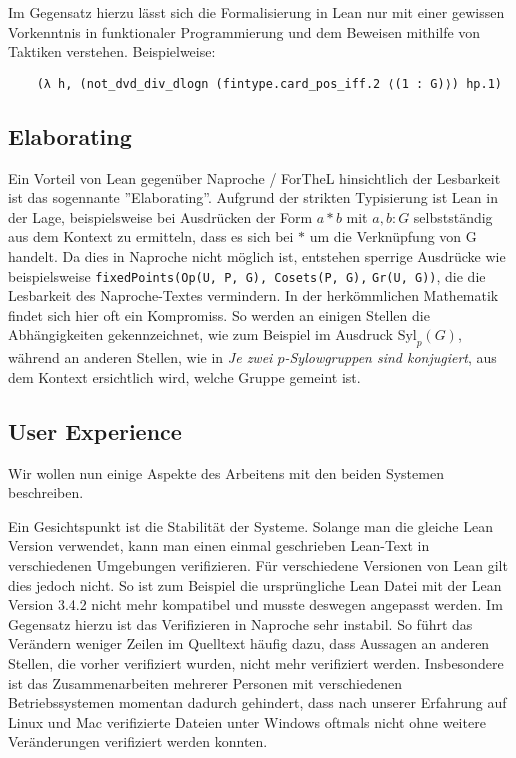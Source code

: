 \documentclass[a4paper,12pt]{scrartcl}
\begin{document}
\medskip

Im Gegensatz hierzu lässt sich die Formalisierung in Lean nur mit einer gewissen Vorkenntnis in funktionaler Programmierung und dem Beweisen mithilfe von Taktiken verstehen. Beispielweise:
\lstset{language=lean}
\begin{lstlisting}
    (λ h, (not_dvd_div_dlogn (fintype.card_pos_iff.2 ⟨(1 : G)⟩) hp.1) 
\end{lstlisting}

\subsection{Elaborating}

Ein Vorteil von Lean gegenüber Naproche / ForTheL hinsichtlich der Lesbarkeit ist das sogennante ''Elaborating''. Aufgrund der strikten Typisierung ist Lean in der Lage, beispielsweise bei Ausdrücken der Form $a * b$ mit $a, b : G$ selbstständig aus dem Kontext zu ermitteln, dass es sich bei $*$ um die Verknüpfung von G handelt. Da dies in Naproche nicht möglich ist, entstehen sperrige Ausdrücke wie beispielsweise \verb!fixedPoints(Op(U, P, G), Cosets(P, G),! \verb!Gr(U, G))!, die die Lesbarkeit des Naproche-Textes vermindern.
In der herkömmlichen Mathematik findet sich hier oft ein Kompromiss. So werden an einigen Stellen die Abhängigkeiten gekennzeichnet, wie zum Beispiel im Ausdruck $\text{Syl}_{p}(G)$, während an anderen Stellen, wie in \textit{Je zwei $p$-Sylowgruppen sind konjugiert}, aus dem Kontext ersichtlich wird, welche Gruppe gemeint ist.

\subsection{User Experience}

Wir wollen nun einige Aspekte des Arbeitens mit den beiden Systemen beschreiben.

Ein Gesichtspunkt ist die Stabilität der Systeme. Solange man die gleiche Lean Version verwendet, kann man einen einmal geschrieben Lean-Text in verschiedenen Umgebungen verifizieren. Für verschiedene Versionen von Lean gilt dies jedoch nicht. So ist zum Beispiel die ursprüngliche Lean Datei \cite{bibtex.c} mit der Lean Version 3.4.2 nicht mehr kompatibel und musste deswegen angepasst werden.
Im Gegensatz hierzu ist das Verifizieren in Naproche sehr instabil. So führt das Verändern weniger Zeilen im Quelltext häufig dazu, dass Aussagen an anderen Stellen, die vorher verifiziert wurden, nicht mehr verifiziert werden. Insbesondere ist das Zusammenarbeiten mehrerer Personen mit verschiedenen Betriebssystemen momentan dadurch gehindert, dass nach unserer Erfahrung auf Linux und Mac verifizierte Dateien unter Windows oftmals nicht ohne weitere Veränderungen verifiziert werden konnten. 
\end{document}
